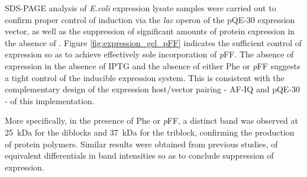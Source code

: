 \begin{refsection}
SDS-PAGE analysis of \emph{E.coli} expression lysate samples were carried out to
confirm proper control of induction via the \emph{lac} operon of the pQE-30
expression vector, as well as the suppression of significant amounts of protein
expression in the absence of .  Figure
\ref{fig:expression_gel_pFF} indicates the sufficient control of expression so
as to achieve effectively sole incorporation of \emph{p}FF. The absence of
expression in the absence of IPTG and the absence of either Phe or \emph{p}FF
suggests a tight control of the inducible expression system. This is consistent
with the complementary design of the expression host/vector pairing - AF-IQ and
pQE-30 - of this implementation.

More specifically, in the presence of Phe or \emph{p}FF, a distinct band was
observed at \SI{25}{\kilo\dalton} for the diblocks and \SI{37}{\kilo\dalton} for
the triblock, confirming the production of protein polymers. Similar results
were obtained from previous studies, of equivalent differentials in band
intensities so as to conclude suppression of expression.\cite{Voloshchuk2009}


\end{refsection}
